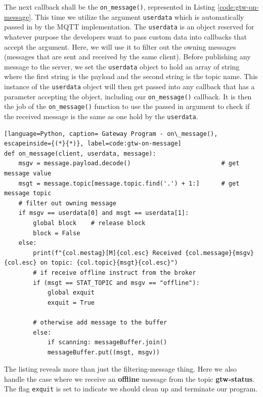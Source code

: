 The next callback shall be the \texttt{on\_message()}, represented in Listing \ref{code:gtw-on-message}. This time we utilize the argument \texttt{userdata} which is automatically passed in by the MQTT implementation. The \texttt{userdata} is an object reserved for whatever purpose the developers want to pass custom data into callbacks that accept the argument. Here, we will use it to filter out the owning messages (messages that are sent and received by the same client). Before publishing any message to the server, we set the \texttt{userdata} object to hold an array of string where the first string is the payload and the second string is the topic name. This instance of the \texttt{userdata} object will then get passed into any callback that has a parameter accepting the object, including our \texttt{on\_message()} callback. It is then the job of the \texttt{on\_message()} function to use the passed in argument to check if the received message is the same as one hold by the \texttt{userdata}.
\begin{lstlisting}[language=Python, caption= Gateway Program - on\_message(), escapeinside={(*}{*)}, label=code:gtw-on-message]
def on_message(client, userdata, message):
    msgv = message.payload.decode()                         # get message value
    msgt = message.topic[message.topic.find('.') + 1:]      # get message topic
    # filter out owning message
    if msgv == userdata[0] and msgt == userdata[1]:
        global block    # release block
        block = False
    else:
        print(f"{col.mestag}[M]{col.esc} Received {col.message}{msgv}{col.esc} on topic: {col.topic}{msgt}{col.esc}")
        # if receive offline instruct from the broker
        if (msgt == STAT_TOPIC and msgv == "offline"):
            global exquit
            exquit = True
        
        # otherwise add message to the buffer
        else:
            if scanning: messageBuffer.join()
            messageBuffer.put((msgt, msgv))
\end{lstlisting}
The listing reveals more than just the filtering-message thing. Here we also handle the case where we receive an \textbf{offline} message from the topic \textbf{gtw-status}. The flag \texttt{exquit} is set to indicate we should clean up and terminate our program.

